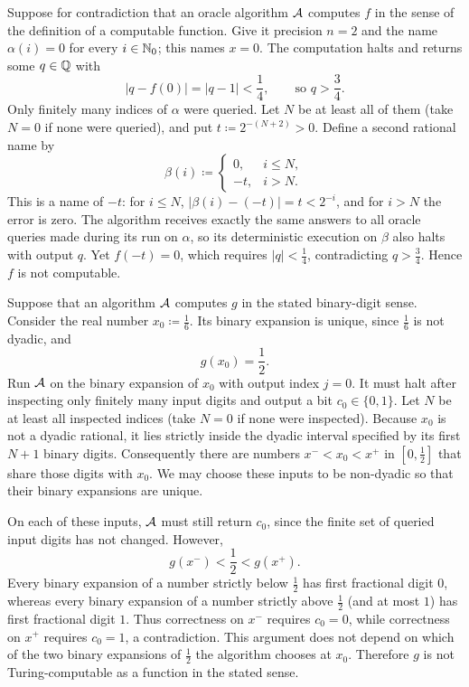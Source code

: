 \documentclass[11pt, oneside]{article}
\begin{document}
\begin{solution}
\begin{problemsubparts}
    \item Suppose for contradiction that an oracle algorithm $\mathcal{A}$
    computes $f$ in the sense of the definition of a computable function.
    Give it precision $n=2$ and the name $\alpha(i)=0$ for every
    $i\in\mathbb{N}_0$; this names $x=0$.
    The computation halts and returns some $q\in\mathbb{Q}$ with
    \[
       |q-f(0)|=|q-1|<\frac14,
       \qquad\text{so }q>\frac34.
    \]
    Only finitely many indices of $\alpha$ were queried. Let $N$ be
    at least all of them (take $N=0$ if none were queried), and put
    $t\coloneqq2^{-(N+2)}>0$.
    Define a second rational name by
    \[
       \beta(i)\coloneqq
       \begin{cases}
           0, &i\le N, \\
          -t, &i>N.
       \end{cases}
    \]
    This is a name of $-t$: for $i\le N$,
    $|\beta(i)-(-t)|=t<2^{-i}$, and for $i>N$ the error is zero.
    The algorithm receives exactly the same answers to all oracle
    queries made during its run on $\alpha$, so its deterministic
    execution on $\beta$ also halts with output $q$.
    Yet $f(-t)=0$, which requires $|q|<\tfrac14$, contradicting
    $q>\tfrac34$. Hence $f$ is not computable.

    \item Suppose that an algorithm $\mathcal{A}$ computes $g$ in the stated
    binary-digit sense. Consider the real number
    $x_0\coloneqq\tfrac16$. Its binary expansion is unique, since
    $\tfrac16$ is not dyadic, and
    \[
        g(x_0)=\frac12.
    \]
    Run $\mathcal{A}$ on the binary expansion of $x_0$ with output index
    $j=0$. It must halt after inspecting only finitely many input
    digits and output a bit $c_0\in\{0, 1\}$.
    Let $N$ be at least all inspected indices (take $N=0$ if none
    were inspected). Because $x_0$ is not a dyadic rational, it lies
    strictly inside the dyadic interval specified by its first
    $N+1$ binary digits. Consequently there are numbers
    $x^-<x_0<x^+$ in $[0, \tfrac12]$ that share those digits with
    $x_0$. We may choose these inputs to be non-dyadic so that their
    binary expansions are unique.

    On each of these inputs, $\mathcal{A}$ must still return $c_0$, since
    the finite set of queried input digits has not changed.
    However,
    \[
        g(x^-)<\frac12<g(x^+).
    \]
    Every binary expansion of a number strictly below $\tfrac12$
    has first fractional digit $0$, whereas every binary expansion
    of a number strictly above $\tfrac12$ (and at most $1$) has
    first fractional digit $1$.
    Thus correctness on $x^-$ requires $c_0=0$, while correctness on
    $x^+$ requires $c_0=1$, a contradiction.
    This argument does not depend on which of the two binary expansions
    of $\tfrac12$ the algorithm chooses at $x_0$.
    Therefore $g$ is not Turing-computable as a function in the stated
    sense.
\end{problemsubparts}
\end{solution}
\end{document}
